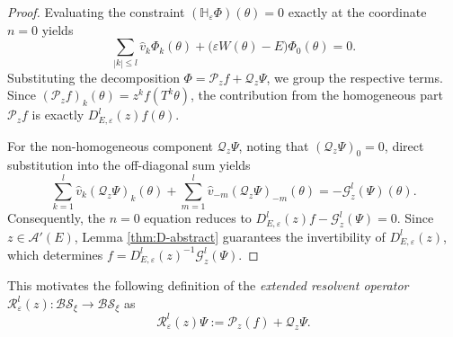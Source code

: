 \documentclass[reqno,11pt]{amsart}
\begin{document}
\begin{proof}
Evaluating the constraint $(\mathbb H_\varepsilon\Phi)(\theta) = 0$ exactly at the coordinate $n=0$ yields
$$
\sum_{|k|\le l} \hat{v}_k \Phi_k(\theta) + \bigl(\varepsilon W(\theta) - E\bigr)\Phi_0(\theta) = 0.
$$
Substituting the decomposition $\Phi = \mathcal{P}_z f + \mathcal{Q}_z \Psi$, we group the respective terms. Since $(\mathcal{P}_z f)_k(\theta) = z^k f(T^k\theta)$, the contribution from the homogeneous part $\mathcal{P}_z f$ is exactly $D^l_{E,\varepsilon}(z)f(\theta)$. 

For the non-homogeneous component $\mathcal{Q}_z \Psi$, noting that $(\mathcal{Q}_z \Psi)_0 = 0$, direct substitution into the off-diagonal sum yields
$$
\sum_{k=1}^l \hat{v}_k (\mathcal{Q}_z \Psi)_k(\theta) + \sum_{m=1}^l \hat{v}_{-m} (\mathcal{Q}_z \Psi)_{-m}(\theta) = -\mathcal{G}_z^l(\Psi)(\theta).
$$
Consequently, the $n=0$ equation reduces  to $D^l_{E,\varepsilon}(z)f - \mathcal{G}_z^l(\Psi) = 0$. Since $z\in\mathcal{A}'(E)$, Lemma \ref{thm:D-abstract} guarantees the invertibility of $D^l_{E,\varepsilon}(z)$, which determines $f = D^l_{E,\varepsilon}(z)^{-1}\mathcal G_z^l(\Psi)$.
\end{proof}




This motivates the following definition
of the \emph{extended resolvent operator} $\mathcal{R}_\varepsilon^l(z): \mathcal{BS}_\xi \to \mathcal{BS}_\xi$ as\begin{equation}\label{def:rec}\mathcal{R}_\varepsilon^l(z)\Psi := \mathcal{P}_z(f) + \mathcal{Q}_z\Psi.\end{equation}
\end{document}
